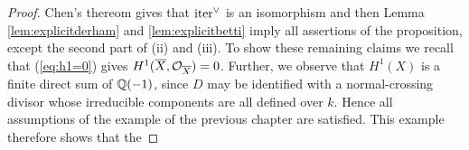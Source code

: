 \begin{proof}
Chen's thereom gives that $\mathrm{iter}^{\vee}$ is an isomorphism and then Lemma \ref{lem:explicitderham} and \ref{lem:explicitbetti} imply all assertions of the proposition, except the second part of (ii) and (iii). 
To show these remaining claims we recall that (\ref{eq:h1=0}) gives $H^1(\overline{X},\mathcal{O}_{\overline{X}})=0$. Further, we observe that $H^1(X)$ is a finite direct sum of $\mathbb{Q}(-1)$, since $D$ may be identified with a normal-crossing divisor whose irreducible components are all defined over $k$.
Hence all assumptions of the example of the previous chapter are satisfied. 
This example therefore shows that the                                                                                                                                                                                                                                                                                                                                                                                                                                                                                                                                                                                                                                                                                                                                                                                                                                                                                                                                                                                         
                                                                                                                                                                                                                                                                                                                                                                                                                                                                                                                                                                                                                                                                                                                                                                                                                                                                                                                                                                                                                              

\end{proof}
